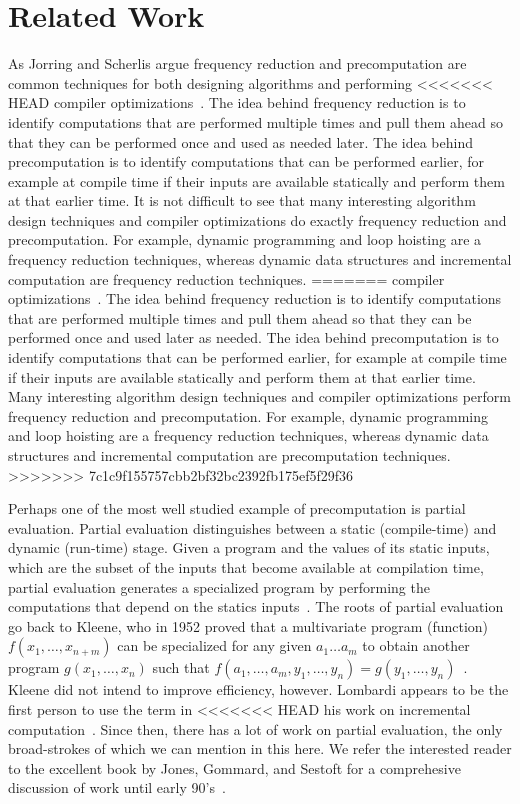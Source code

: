 \section{Related Work}

As Jorring and Scherlis argue frequency reduction and precomputation
are common techniques for both designing algorithms and performing
<<<<<<< HEAD
compiler optimizations~\cite{JS86-staging}.  The idea behind
frequency reduction is to identify computations that are performed
multiple times and pull them ahead so that they can be performed once
and used as needed later.  The idea behind precomputation is to
identify computations that can be performed earlier, for example at
compile time if their inputs are available statically and perform them
at that earlier time. It is not difficult to see that many interesting
algorithm design techniques and compiler optimizations do exactly
frequency reduction and precomputation.  For example, dynamic
programming and loop hoisting are a frequency reduction techniques,
whereas dynamic data structures and incremental computation are
frequency reduction techniques.
=======
compiler optimizations~\cite{JS86-staging}.  The idea behind frequency
reduction is to identify computations that are performed multiple
times and pull them ahead so that they can be performed once and used
later as needed.  The idea behind precomputation is to identify
computations that can be performed earlier, for example at compile
time if their inputs are available statically and perform them at that
earlier time.  Many interesting algorithm design techniques and
compiler optimizations perform frequency reduction and precomputation.
For example, dynamic programming and loop hoisting are a frequency
reduction techniques, whereas dynamic data structures and incremental
computation are precomputation techniques.
>>>>>>> 7c1c9f155757cbb2bf32bc2392fb175ef5f29f36

Perhaps one of the most well studied example of precomputation is
partial evaluation.  Partial evaluation distinguishes between a static
(compile-time) and dynamic (run-time) stage. Given a program and the
values of its static inputs, which are the subset of the inputs that
become available at compilation time, partial evaluation generates a
specialized program by performing the computations that depend on the
statics inputs~\cite{jones96}.  The roots of partial evaluation go
back to Kleene, who in 1952 proved that a multivariate program
(function) $f(x_1, \ldots, x_{n+m})$ can be specialized for any given
$a_1 \ldots a_m$ to obtain another program $g(x_1, \ldots, x_n)$ such
that $f(a_1, \ldots, a_m, y_1, \ldots, y_n) = g(y_1, \ldots,
y_n)$~\cite{Kleene52}.  Kleene did not intend to improve efficiency,
however.  Lombardi appears to be the first person to use the term in
<<<<<<< HEAD
his work on incremental computation~.  Since then,
there has a lot of work on partial evaluation, the only broad-strokes
of which we can mention in this here.  We refer the interested reader
to the excellent book by Jones, Gommard, and Sestoft for a
comprehesive discussion of work until early 90's~\cite{JGS93}.

